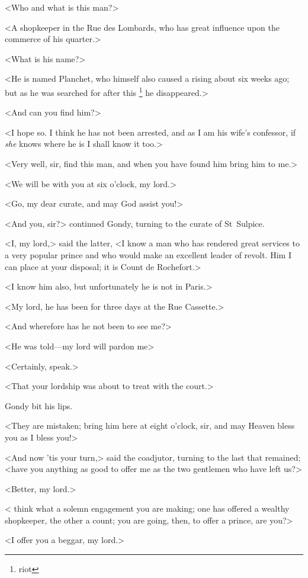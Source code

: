<Who and what is this man?>

<A shopkeeper in the Rue des Lombards, who has great influence upon the commerce of his quarter.>

<What is his name?>

<He is named Planchet, who himself also caused a rising about six weeks ago; but as he was searched for after this \footnote{riot} he disappeared.>

<And can you find him?>

<I hope so. I think he has not been arrested, and as I am his wife's confessor, if \emph{she} knows where he is I shall know it too.>

<Very well, sir, find this man, and when you have found him bring him to me.>

<We will be with you at six o'clock, my lord.>

<Go, my dear curate, and may God assist you!>

<And you, sir?> continued Gondy, turning to the curate of St~Sulpice.

<I, my lord,> said the latter, <I know a man who has rendered great services to a very popular prince and who would make an excellent leader of revolt. Him I can place at your disposal; it is Count de Rochefort.>

<I know him also, but unfortunately he is not in Paris.>

<My lord, he has been for three days at the Rue Cassette.>

<And wherefore has he not been to see me?>

<He was told—my lord will pardon me\longdash>

<Certainly, speak.>

<That your lordship was about to treat with the court.>

Gondy bit his lips.

<They are mistaken; bring him here at eight o'clock, sir, and may Heaven bless you as I bless you!>

<And now 'tis your turn,> said the coadjutor, turning to the last that remained; <have you anything as good to offer me as the two gentlemen who have left us?>

<Better, my lord.>

< think what a solemn engagement you are making; one has offered a wealthy shopkeeper, the other a count; you are going, then, to offer a prince, are you?>

<I offer you a beggar, my lord.>

